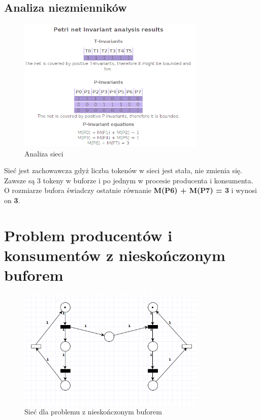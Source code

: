 \documentclass{article}
\begin{document}
\subsection{Analiza niezmienników}
\begin{figure}[H]
    \centering
    \includegraphics[width=0.8\textwidth, height=0.4\textheight]{zad4_analiza.png}
    \caption{Analiza sieci}
\end{figure}

Sieć jest zachowawcza gdyż liczba tokenów w sieci 
jest stała, nie zmienia się. Zawsze są 3 tokeny w buforze i po jednym
w procesie producenta i konsumenta.
O rozmiarze bufora świadczy ostatnie równanie
\textbf{M(P6) + M(P7) = 3} i wynosi on \textbf{3}.

\section{Problem producentów i konsumentów z nieskończonym buforem}
\begin{figure}[H]
    \centering
    \includegraphics[width=0.8\textwidth, height=0.4\textheight]{zad5.png}
    \caption{Sieć dla problemu z nieskończonym buforem}
\end{figure}
\end{document}
